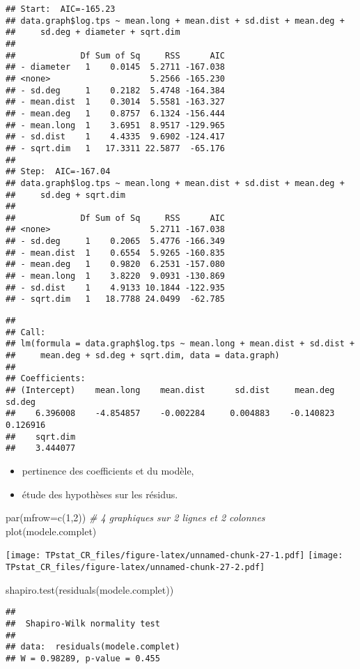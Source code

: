 \documentclass[
]{article}
\newenvironment{Shaded}{\begin{snugshade}}{\end{snugshade}}
\newcommand{\AttributeTok}[1]{\textcolor[rgb]{0.77,0.63,0.00}{#1}}
\newcommand{\CommentTok}[1]{\textcolor[rgb]{0.56,0.35,0.01}{\textit{#1}}}
\newcommand{\DecValTok}[1]{\textcolor[rgb]{0.00,0.00,0.81}{#1}}
\newcommand{\FunctionTok}[1]{\textcolor[rgb]{0.00,0.00,0.00}{#1}}
\newcommand{\NormalTok}[1]{#1}
\begin{document}
\begin{verbatim}
## Start:  AIC=-165.23
## data.graph$log.tps ~ mean.long + mean.dist + sd.dist + mean.deg + 
##     sd.deg + diameter + sqrt.dim
## 
##             Df Sum of Sq     RSS      AIC
## - diameter   1    0.0145  5.2711 -167.038
## <none>                    5.2566 -165.230
## - sd.deg     1    0.2182  5.4748 -164.384
## - mean.dist  1    0.3014  5.5581 -163.327
## - mean.deg   1    0.8757  6.1324 -156.444
## - mean.long  1    3.6951  8.9517 -129.965
## - sd.dist    1    4.4335  9.6902 -124.417
## - sqrt.dim   1   17.3311 22.5877  -65.176
## 
## Step:  AIC=-167.04
## data.graph$log.tps ~ mean.long + mean.dist + sd.dist + mean.deg + 
##     sd.deg + sqrt.dim
## 
##             Df Sum of Sq     RSS      AIC
## <none>                    5.2711 -167.038
## - sd.deg     1    0.2065  5.4776 -166.349
## - mean.dist  1    0.6554  5.9265 -160.835
## - mean.deg   1    0.9820  6.2531 -157.080
## - mean.long  1    3.8220  9.0931 -130.869
## - sd.dist    1    4.9133 10.1844 -122.935
## - sqrt.dim   1   18.7788 24.0499  -62.785
\end{verbatim}

\begin{verbatim}
## 
## Call:
## lm(formula = data.graph$log.tps ~ mean.long + mean.dist + sd.dist + 
##     mean.deg + sd.deg + sqrt.dim, data = data.graph)
## 
## Coefficients:
## (Intercept)    mean.long    mean.dist      sd.dist     mean.deg       sd.deg  
##    6.396008    -4.854857    -0.002284     0.004883    -0.140823     0.126916  
##    sqrt.dim  
##    3.444077
\end{verbatim}

\begin{itemize}
\item
  pertinence des coefficients et du modèle,
\item
  étude des hypothèses sur les résidus.
\end{itemize}

\begin{Shaded}
\begin{Highlighting}[]
\FunctionTok{par}\NormalTok{(}\AttributeTok{mfrow=}\FunctionTok{c}\NormalTok{(}\DecValTok{1}\NormalTok{,}\DecValTok{2}\NormalTok{)) }\CommentTok{\# 4 graphiques sur 2 lignes et 2 colonnes}
\FunctionTok{plot}\NormalTok{(modele.complet)}
\end{Highlighting}
\end{Shaded}

\texttt{[image: TPstat\_CR\_files/figure-latex/unnamed-chunk-27-1.pdf]}
\texttt{[image: TPstat\_CR\_files/figure-latex/unnamed-chunk-27-2.pdf]}

\begin{Shaded}
\begin{Highlighting}[]
\FunctionTok{shapiro.test}\NormalTok{(}\FunctionTok{residuals}\NormalTok{(modele.complet))}
\end{Highlighting}
\end{Shaded}

\begin{verbatim}
## 
##  Shapiro-Wilk normality test
## 
## data:  residuals(modele.complet)
## W = 0.98289, p-value = 0.455
\end{verbatim}
\end{document}
